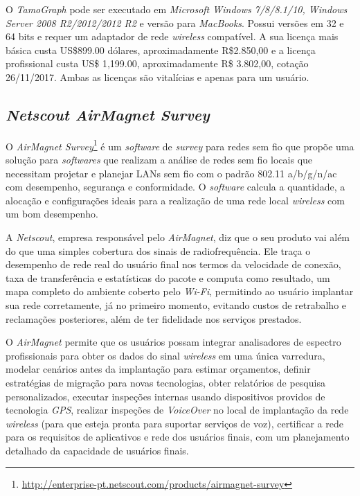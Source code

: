 \documentclass[
	12pt,				%
	twoside,			%
	a4paper,			%
	english,			%
	french,				%
	spanish,			%
	brazil				%
	]{abntex2}
\begin{document}
O \emph{TamoGraph} pode ser executado em \emph{Microsoft Windows
7/8/8.1/10, Windows Server 2008 R2/2012/2012 R2} e versão para
\emph{MacBooks}. Possui versões em 32 e 64 bits e requer um adaptador de
rede \emph{wireless} compatível. A sua licença mais básica custa
US\$899.00 dólares, aproximadamente R\$2.850,00 e a licença profissional
custa US\$ 1,199.00, aproximadamente R\$ 3.802,00, cotação 26/11/2017.
Ambas as licenças são vitalícias e apenas para um usuário.

\subsection{\texorpdfstring{\emph{Netscout AirMagnet
Survey}}{Netscout AirMagnet Survey}}\label{netscout-airmagnet-survey}

O \emph{AirMagnet Survey}\footnote{\url{http://enterprise-pt.netscout.com/products/airmagnet-survey}}
é um \emph{software} de \emph{survey} para redes sem fio que propõe uma
solução para \emph{softwares} que realizam a análise de redes sem fio
locais que necessitam projetar e planejar LANs sem fio com o padrão
802.11 a/b/g/n/ac com desempenho, segurança e conformidade. O
\emph{software} calcula a quantidade, a alocação e configurações ideais
para a realização de uma rede local \emph{wireless} com um bom
desempenho.

A \emph{Netscout}, empresa responsável pelo \emph{AirMagnet}, diz que o
seu produto vai além do que uma simples cobertura dos sinais de
radiofrequência. Ele traça o desempenho de rede real do usuário final
nos termos da velocidade de conexão, taxa de transferência e
estatísticas do pacote e computa como resultado, um mapa completo do
ambiente coberto pelo \emph{Wi-Fi}, permitindo ao usuário implantar sua
rede corretamente, já no primeiro momento, evitando custos de retrabalho
e reclamações posteriores, além de ter fidelidade nos serviços
prestados.

O \emph{AirMagnet} permite que os usuários possam integrar analisadores
de espectro profissionais para obter os dados do sinal \emph{wireless}
em uma única varredura, modelar cenários antes da implantação para
estimar orçamentos, definir estratégias de migração para novas
tecnologias, obter relatórios de pesquisa personalizados, executar
inspeções internas usando dispositivos providos de tecnologia
\emph{GPS}, realizar inspeções de \emph{VoiceOver} no local de
implantação da rede \emph{wireless} (para que esteja pronta para
suportar serviços de voz), certificar a rede para os requisitos de
aplicativos e rede dos usuários finais, com um planejamento detalhado da
capacidade de usuários finais.
\end{document}
